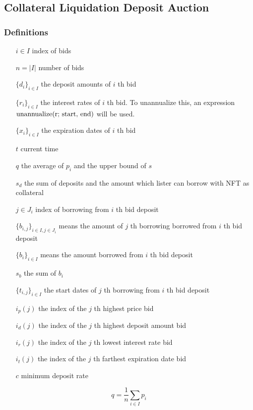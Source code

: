 \documentclass[dvipdfmx]{jsarticle}
\begin{document}
\subsection{Collateral Liquidation Deposit Auction}

\subsubsection{Definitions}

\begin{itemize}
  \item[$i \in I$] index of bids
  \item[$n = |I|$] number of bids
  \item[$\{d_i\}_{i \in I}$] the deposit amounts of $i$ th bid
  \item[$\{r_i\}_{i \in I}$] the interest rates of $i$ th bid. To unannualize this, an expression $\text{unannualize(r; \text{start}, \text{end})}$ will be used.
  \item[$\{x_i\}_{i \in I}$] the expiration dates of $i$ th bid
  \item[$t$] current time 
  \item[$q$] the average of $p_i$ and the upper bound of $s$
  \item[$s_d$] the sum of deposits and the amount which lister can borrow with NFT as collateral
  \item[$j \in J_i$] index of borrowing from $i$ th bid deposit 
  \item[$\{b_{i,j}\}_{i \in I, j \in J_i}$] means the amount of $j$ th borrowing borrowed from $i$ th bid deposit
  \item[$\{b_i\}_{i \in I}$] means the amount borrowed from $i$ th bid deposit
  \item[$s_b$] the sum of $b_i$
  \item[$\{t_{i,j}\}_{i \in I}$] the start dates of $j$ th borrowing from $i$ th bid deposit
  \item[$i_p(j)$] the index of the $j$ th highest price bid
  \item[$i_d(j)$] the index of the $j$ th highest deposit amount bid
  \item[$i_r(j)$] the index of the $j$ th lowest interest rate bid
  \item[$i_t(j)$] the index of the $j$ th farthest expiration date bid
  \item[$c$] minimum deposit rate
\end{itemize}

$$
  q = \frac{1}{n} \sum_{i \in I} p_i
$$
\end{document}
